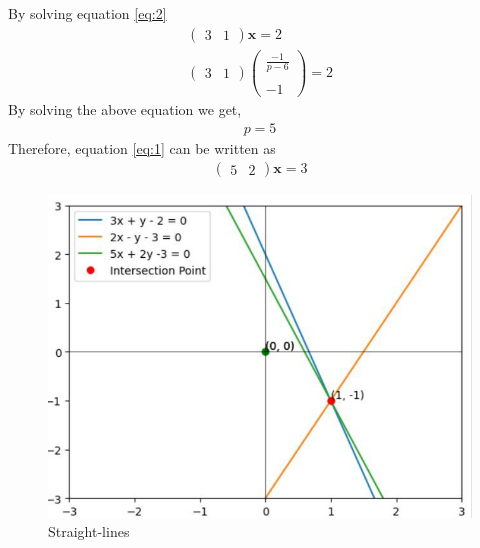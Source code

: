 \documentclass[12pt]{article}
\newcommand{\myvec}[1]{\ensuremath{\begin{pmatrix}#1\end{pmatrix}}}
\let\vec\mathbf
\begin{document}
By solving equation \eqref{eq:2}\\
\begin{align}
	\myvec{3 & 1}\vec{x} = 2 \\
	\myvec{3 & 1}\myvec{\frac{-1}{p-6} \\ \\ -1} = 2
\end{align}
By solving the above equation we get,\\
\begin{align}
	p = 5 
\end{align}
Therefore, equation \eqref{eq:1} can be written as
\begin{align}
	\myvec{5 & 2}\vec{x} = 3
\end{align}
\begin{figure}[H]
	\centering
	\includegraphics[width=\columnwidth]{figs/graph.jpg}
	\caption{Straight-lines}
	\label{fig:st.lines}
\end{figure}
\end{document}
